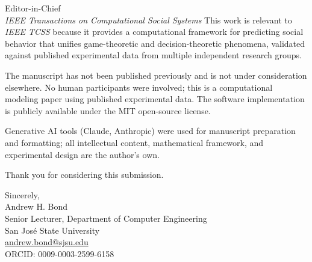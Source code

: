 \documentclass[12pt]{letter}
\begin{document}
\begin{letter}{%
Editor-in-Chief\\
\emph{IEEE Transactions on Computational Social Systems}}
This work is relevant to \emph{IEEE TCSS} because it provides a computational framework for predicting social behavior that unifies game-theoretic and decision-theoretic phenomena, validated against published experimental data from multiple independent research groups.

The manuscript has not been published previously and is not under consideration elsewhere.  No human participants were involved; this is a computational modeling paper using published experimental data.  The software implementation is publicly available under the MIT open-source license.

Generative AI tools (Claude, Anthropic) were used for manuscript preparation and formatting; all intellectual content, mathematical framework, and experimental design are the author's own.

Thank you for considering this submission.

\closing{Sincerely,\\[2em]
Andrew H. Bond\\
Senior Lecturer, Department of Computer Engineering\\
San Jos\'{e} State University\\
\href{mailto:andrew.bond@sjsu.edu}{andrew.bond@sjsu.edu}\\
ORCID: 0009-0003-2599-6158}

\end{letter}
\end{document}
